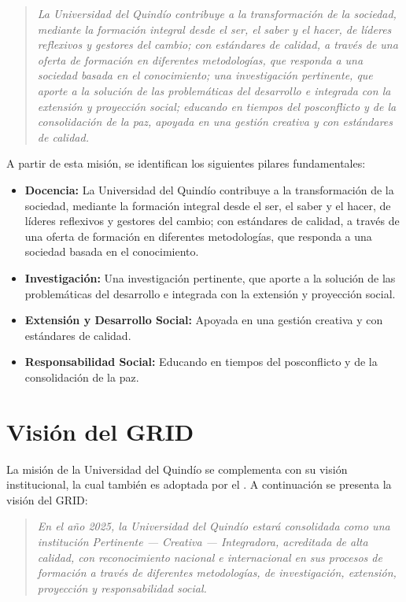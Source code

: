 \begin{quote}
\textit{La Universidad del Quindío contribuye a la transformación de la sociedad, mediante la formación integral desde el ser, el saber y el hacer, de líderes reflexivos y gestores del cambio; con estándares de calidad, a través de una oferta de formación en diferentes metodologías, que responda a una sociedad basada en el conocimiento; una investigación pertinente, que aporte a la solución de las problemáticas del desarrollo e integrada con la extensión y proyección social; educando en tiempos del posconflicto y de la consolidación de la paz, apoyada en una gestión creativa y con estándares de calidad.}
\end{quote}

A partir de esta misión, se identifican los siguientes pilares fundamentales:

\begin{itemize}
    \item \textbf{Docencia:} La Universidad del Quindío contribuye a la transformación de la sociedad, mediante la formación integral desde el ser, el saber y el hacer, de líderes reflexivos y gestores del cambio; con estándares de calidad, a través de una oferta de formación en diferentes metodologías, que responda a una sociedad basada en el conocimiento.

    \item \textbf{Investigación:} Una investigación pertinente, que aporte a la solución de las problemáticas del desarrollo e integrada con la extensión y proyección social.

    \item \textbf{Extensión y Desarrollo Social:} Apoyada en una gestión creativa y con estándares de calidad.

    \item \textbf{Responsabilidad Social:} Educando en tiempos del posconflicto y de la consolidación de la paz.
\end{itemize}

\section{Visión del GRID}
La misión de la Universidad del Quindío se complementa con su visión institucional, la cual también es adoptada por el \GRID. A continuación se presenta la visión del GRID:\@

\begin{quote}
\textit{En el año 2025, la Universidad del Quindío estará consolidada como una institución \textit{Pertinente --- Creativa --- Integradora}, acreditada de alta calidad, con reconocimiento nacional e internacional en sus procesos de formación a través de diferentes metodologías, de investigación, extensión, proyección y responsabilidad social.}
\end{quote}


